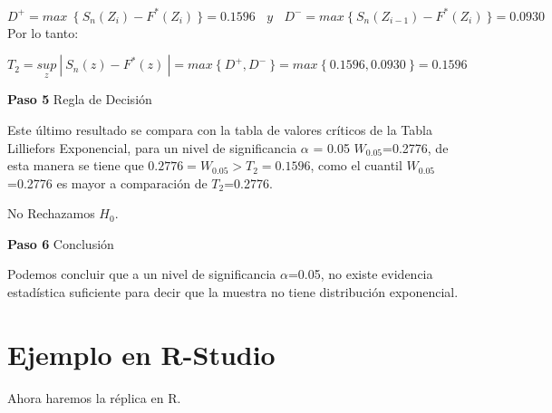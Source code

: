 \documentclass[
  a4paper,
  oneside,
  openany]{book}
\begin{document}
\[ D^+= max \ \  \{\ S_{n}(Z_{i})-F^*(Z_{i}) \ \}= 0.1596 \ \ \ \ y\ \ \ \ D^-= max\  \{ \ S_{n}(Z_{i-1})-F^*(Z_{i}) \ \}=0.0930 \]
Por lo tanto:

\[T_{2}=\underset{z}{sup}\ | \ S_{n}(z)-F^*(z) \ |=max \ \{\ D^+,D^- \ \}=max \ \{ \ 0.1596,0.0930 \ \}=0.1596 \]

\textbf{Paso 5} Regla de Decisión

Este último resultado se compara con la tabla de valores críticos de la Tabla Lilliefors Exponencial, para un nivel de significancia \(\alpha\) = 0.05 \(W_{0.05}\)=0.2776, de esta manera se tiene que \(0.2776 = W_{0.05} > T_{2} = 0.1596\), como el cuantil \(W_{0.05}\)=0.2776 es mayor a comparación de \(T_{2}\)=0.2776.

No Rechazamos \(H_0\).

\textbf{Paso 6} Conclusión

Podemos concluir que a un nivel de significancia \(\alpha\)=0.05, no existe evidencia estadística suficiente para decir que la muestra no tiene distribución exponencial.

\hypertarget{ejemplo-en-r-studio-16}{%
\section{Ejemplo en R-Studio}\label{ejemplo-en-r-studio-16}}

Ahora haremos la réplica en R.
\end{document}
